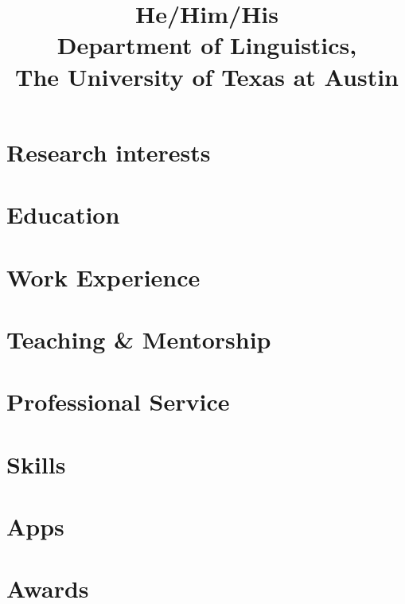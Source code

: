 \documentclass[a4paper]{practical-cv}
\title{He/Him/His\\Department of Linguistics,\\The University of Texas at Austin}
\begin{document}
\makecvtitle

\section{Research interests}


\section{Education}


\printbibliography[title=Publications, nottype=talk]

\printbibliography[title=Talks, type=talk]

\section{Work Experience}


\section{Teaching \& Mentorship}


\section{Professional Service}


\section{Skills}


\section{Apps}


\section{Awards}

\end{document}
